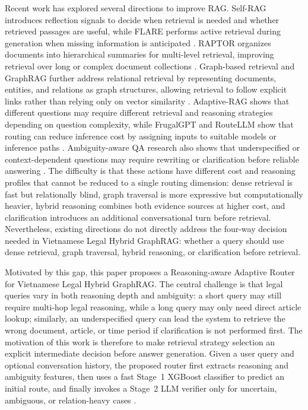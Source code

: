 \documentclass[11pt,twocolumn]{article}
\begin{document}
Recent work has explored several directions to improve RAG.
Self-RAG introduces reflection signals to decide when
retrieval is needed and whether retrieved passages are
useful, while FLARE performs active retrieval during
generation when missing information is anticipated
\cite{asai2023selfrag,jiang2023flare}. RAPTOR organizes
documents into hierarchical summaries for multi-level
retrieval, improving retrieval over long or complex
document collections \cite{sarthi2024raptor}. Graph-based
retrieval and GraphRAG further address relational retrieval
by representing documents, entities, and relations as graph
structures, allowing retrieval to follow explicit links
rather than relying only on vector similarity
\cite{edge2024graphrag,wang2024kgp,li2024graphreader}.
Adaptive-RAG shows that different questions may require
different retrieval and reasoning strategies depending on
question complexity, while FrugalGPT and RouteLLM show that
routing can reduce inference cost by assigning inputs to
suitable models or inference paths
\cite{jeong2024adaptive,chen2023frugalgpt,ong2024routellm}.
Ambiguity-aware QA research also shows that underspecified
or context-dependent questions may require rewriting or
clarification before reliable answering
\cite{min2020ambigqa,elgohary2019canard}. The difficulty is
that these actions have different cost and reasoning
profiles that cannot be reduced to a single routing
dimension: dense retrieval is fast but relationally blind,
graph traversal is more expressive but computationally
heavier, hybrid reasoning combines both evidence sources at
higher cost, and clarification introduces an additional
conversational turn before retrieval. Nevertheless, existing
directions do not directly address the four-way decision
needed in Vietnamese Legal Hybrid GraphRAG: whether a query
should use dense retrieval, graph traversal, hybrid
reasoning, or clarification before retrieval.

Motivated by this gap, this paper proposes a
Reasoning-aware Adaptive Router for Vietnamese Legal Hybrid
GraphRAG. The central challenge is that legal queries vary
in both reasoning depth and ambiguity: a short query may
still require multi-hop legal reasoning, while a long query
may only need direct article lookup; similarly, an
underspecified query can lead the system to retrieve the
wrong document, article, or time period if clarification is
not performed first. The motivation of this work is therefore
to make retrieval strategy selection an explicit intermediate
decision before answer generation. Given a user query and
optional conversation history, the proposed router first
extracts reasoning and ambiguity features, then uses a fast
Stage~1 XGBoost classifier to predict an initial route, and
finally invokes a Stage~2 LLM verifier only for uncertain,
ambiguous, or relation-heavy cases
\cite{chen2016xgboost,jeong2024adaptive}.
\end{document}
